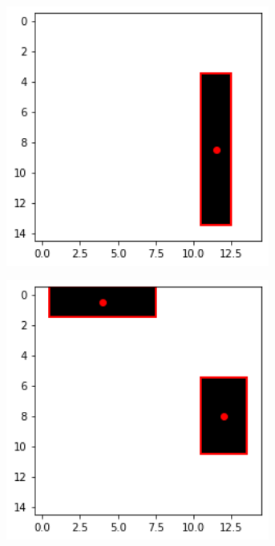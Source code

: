 \begin{figure}[htbp]
    \centering
    \begin{subfigure}{0.32\textwidth}
        \centering
        \includegraphics[width=0.95\textwidth]{images/faceDetec/loss-function/rectangle-example.png}
    \end{subfigure}
    \hfill
    \begin{subfigure}{0.32\textwidth}
        \centering
        \includegraphics[width=0.95\textwidth]{images/faceDetec/loss-function/rectangle-example-2.png}

\end{subfigure}
\end{figure}
